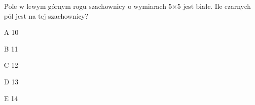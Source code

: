 \begin{tresc}
Pole w lewym górnym rogu szachownicy o wymiarach 5×5 jest białe. Ile czarnych pól jest na tej szachownicy?
\end{tresc}
\begin{wariant}{A} 10 \end{wariant}
\begin{wariant}{B} 11 \end{wariant}
\begin{wariant}{C} 12 \end{wariant}
\begin{wariant}{D} 13 \end{wariant}
\begin{wariant}{E} 14 \end{wariant}
